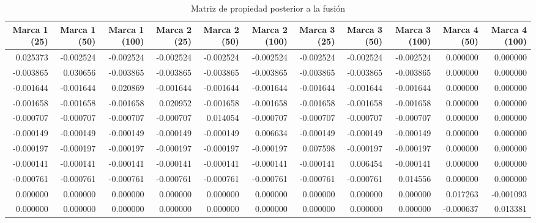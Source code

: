 \begin{table}
\centering
\caption{Matriz de propiedad posterior a la fusión}
\begin{tabular}{rrrrrrrrrrr}
\toprule
 Marca 1 (25) &  Marca 1 (50) &  Marca 1 (100) &  Marca 2 (25) &  Marca 2 (50) &  Marca 2 (100) &  Marca 3 (25) &  Marca 3 (50) &  Marca 3 (100) &  Marca 4 (50) &  Marca 4 (100) \\
\midrule
     0.025373 &     -0.002524 &      -0.002524 &     -0.002524 &     -0.002524 &      -0.002524 &     -0.002524 &     -0.002524 &      -0.002524 &      0.000000 &       0.000000 \\
    -0.003865 &      0.030656 &      -0.003865 &     -0.003865 &     -0.003865 &      -0.003865 &     -0.003865 &     -0.003865 &      -0.003865 &      0.000000 &       0.000000 \\
    -0.001644 &     -0.001644 &       0.020869 &     -0.001644 &     -0.001644 &      -0.001644 &     -0.001644 &     -0.001644 &      -0.001644 &      0.000000 &       0.000000 \\
    -0.001658 &     -0.001658 &      -0.001658 &      0.020952 &     -0.001658 &      -0.001658 &     -0.001658 &     -0.001658 &      -0.001658 &      0.000000 &       0.000000 \\
    -0.000707 &     -0.000707 &      -0.000707 &     -0.000707 &      0.014054 &      -0.000707 &     -0.000707 &     -0.000707 &      -0.000707 &      0.000000 &       0.000000 \\
    -0.000149 &     -0.000149 &      -0.000149 &     -0.000149 &     -0.000149 &       0.006634 &     -0.000149 &     -0.000149 &      -0.000149 &      0.000000 &       0.000000 \\
    -0.000197 &     -0.000197 &      -0.000197 &     -0.000197 &     -0.000197 &      -0.000197 &      0.007598 &     -0.000197 &      -0.000197 &      0.000000 &       0.000000 \\
    -0.000141 &     -0.000141 &      -0.000141 &     -0.000141 &     -0.000141 &      -0.000141 &     -0.000141 &      0.006454 &      -0.000141 &      0.000000 &       0.000000 \\
    -0.000761 &     -0.000761 &      -0.000761 &     -0.000761 &     -0.000761 &      -0.000761 &     -0.000761 &     -0.000761 &       0.014556 &      0.000000 &       0.000000 \\
     0.000000 &      0.000000 &       0.000000 &      0.000000 &      0.000000 &       0.000000 &      0.000000 &      0.000000 &       0.000000 &      0.017263 &      -0.001093 \\
     0.000000 &      0.000000 &       0.000000 &      0.000000 &      0.000000 &       0.000000 &      0.000000 &      0.000000 &       0.000000 &     -0.000637 &       0.013381 \\
\bottomrule
\end{tabular}
\end{table}
